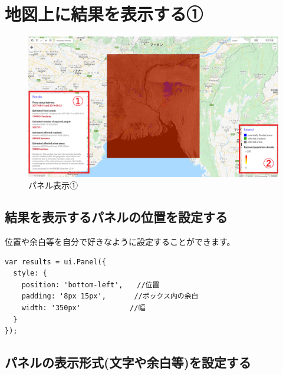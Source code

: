 \documentclass[
]{book}
\begin{document}
\hypertarget{ux5730ux56f3ux4e0aux306bux7d50ux679cux3092ux8868ux793aux3059ux308bux2460}{%
\section{地図上に結果を表示する①}\label{ux5730ux56f3ux4e0aux306bux7d50ux679cux3092ux8868ux793aux3059ux308bux2460}}

\begin{figure}
\centering
\includegraphics{images/example1.png}
\caption{パネル表示①}
\end{figure}

\hypertarget{ux7d50ux679cux3092ux8868ux793aux3059ux308bux30d1ux30cdux30ebux306eux4f4dux7f6eux3092ux8a2dux5b9aux3059ux308b}{%
\subsection{結果を表示するパネルの位置を設定する　　}\label{ux7d50ux679cux3092ux8868ux793aux3059ux308bux30d1ux30cdux30ebux306eux4f4dux7f6eux3092ux8a2dux5b9aux3059ux308b}}

位置や余白等を自分で好きなように設定することができます。

\begin{verbatim}
var results = ui.Panel({
  style: {
    position: 'bottom-left',　　//位置
    padding: '8px 15px',　　　　//ボックス内の余白
    width: '350px'　　　　　　　//幅
  }
});
\end{verbatim}

\hypertarget{ux30d1ux30cdux30ebux306eux8868ux793aux5f62ux5f0fux6587ux5b57ux3084ux4f59ux767dux7b49ux3092ux8a2dux5b9aux3059ux308b}{%
\subsection{パネルの表示形式(文字や余白等)を設定する}\label{ux30d1ux30cdux30ebux306eux8868ux793aux5f62ux5f0fux6587ux5b57ux3084ux4f59ux767dux7b49ux3092ux8a2dux5b9aux3059ux308b}}
\end{document}
